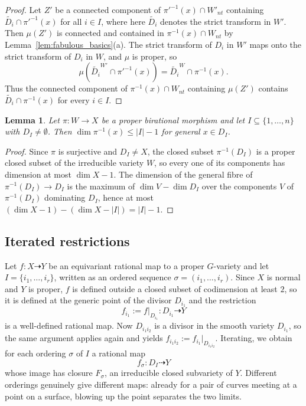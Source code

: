 \documentclass[11pt]{amsart}
\theoremstyle{plain}
\newtheorem{lemma}[theorem]{Lemma}
\theoremstyle{definition}
\theoremstyle{remark}
\numberwithin{equation}{section}
\begin{document}
\begin{proof}
Let $Z'$ be a connected component of $\pi'^{-1}(x) \cap W'_{nt}$ containing
$\widetilde{D_i} \cap \pi'^{-1}(x)$ for all $i \in I$, where here
$\widetilde{D_i}$ denotes the strict transform in $W'$.  Then $\mu(Z')$ is
connected and contained in $\pi^{-1}(x) \cap W_{nt}$ by
Lemma~\ref{lem:fabulous_basics}(a).  The strict transform of $D_i$ in $W'$
maps onto the strict transform of $D_i$ in $W$, and $\mu$ is proper, so
\[
\mu \left( \widetilde{D_i}^{W'} \cap \pi'^{-1}(x) \right)
= \widetilde{D_i}^{W} \cap \pi^{-1}(x) .
\]
Thus the connected component of $\pi^{-1}(x) \cap W_{nt}$ containing
$\mu(Z')$ contains $\widetilde{D_i} \cap \pi^{-1}(x)$ for every $i \in I$.
\end{proof}

\begin{lemma} \label{lem:fibre_dimension}
Let $\pi : W \to X$ be a proper birational morphism and let
$I \subseteq \{1,\ldots,n\}$ with $D_I \neq \emptyset$.  Then
$\dim \pi^{-1}(x) \leq |I| - 1$ for general $x \in D_I$.
\end{lemma}

\begin{proof}
Since $\pi$ is surjective and $D_I \neq X$, the closed subset
$\pi^{-1}(D_I)$ is a proper closed subset of the irreducible variety $W$,
so every one of its components has dimension at most $\dim X - 1$.  The
dimension of the general fibre of $\pi^{-1}(D_I) \to D_I$ is the maximum of
$\dim V - \dim D_I$ over the components $V$ of $\pi^{-1}(D_I)$ dominating
$D_I$, hence at most
$(\dim X - 1) - (\dim X - |I|) = |I| - 1$.
\end{proof}

\subsection*{Iterated restrictions}

Let $f : X \dasharrow Y$ be an equivariant rational map to a proper
$G$-variety and let $I = \{i_1,\ldots,i_r\}$, written as an ordered
sequence $\sigma = (i_1,\ldots,i_r)$.  Since $X$ is normal and $Y$ is
proper, $f$ is defined outside a closed subset of codimension at least $2$,
so it is defined at the generic point of the divisor $D_{i_1}$ and the
restriction
\[
f_{i_1} := f|_{D_{i_1}} : D_{i_1} \dasharrow Y
\]
is a well-defined rational map.  Now $D_{i_1 i_2}$ is a divisor in the
smooth variety $D_{i_1}$, so the same argument applies again and yields
$f_{i_1 i_2} := f_{i_1}|_{D_{i_1 i_2}}$.  Iterating, we obtain for each
ordering $\sigma$ of $I$ a rational map
\[
f_\sigma : D_I \dasharrow Y
\]
whose image has closure $F_\sigma$, an irreducible closed subvariety of
$Y$.  Different orderings genuinely give different maps: already for a
pair of curves meeting at a point on a surface, blowing up the point
separates the two limits.
\end{document}
